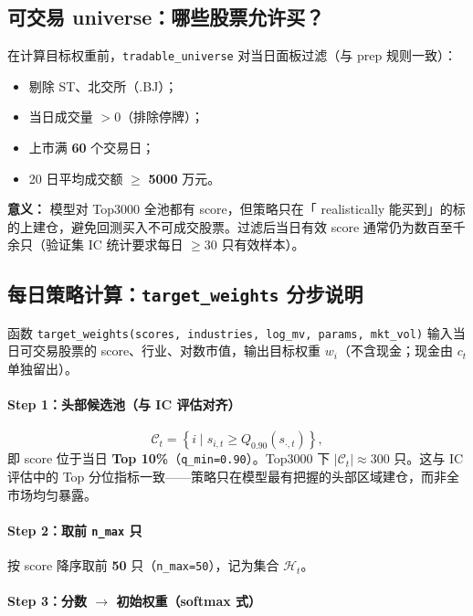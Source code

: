 \documentclass[UTF8,a4paper,12pt]{ctexart}
\begin{document}
\subsection{可交易 universe：哪些股票允许买？}

在计算目标权重前，\texttt{tradable\_universe} 对当日面板过滤（与 prep 规则一致）：
\begin{itemize}[leftmargin=2em]
  \item 剔除 ST、北交所（.BJ）；
  \item 当日成交量 $>0$（排除停牌）；
  \item 上市满 \textbf{60} 个交易日；
  \item 20 日平均成交额 $\geq$ \textbf{5000} 万元。
\end{itemize}

\textbf{意义：} 模型对 Top3000 全池都有 score，但策略只在「 realistically 能买到」的标的上建仓，避免回测买入不可成交股票。过滤后当日有效 score 通常仍为数百至千余只（验证集 IC 统计要求每日 $\ge 30$ 只有效样本）。

\subsection{每日策略计算：\texttt{target\_weights} 分步说明}

函数 \texttt{target\_weights(scores, industries, log\_mv, params, mkt\_vol)} 输入当日可交易股票的 score、行业、对数市值，输出目标权重 $w_i$（不含现金；现金由 $c_t$ 单独留出）。

\paragraph{Step 1：头部候选池（与 IC 评估对齐）}

\begin{equation}
  \mathcal{C}_t = \left\{ i \mid s_{i,t} \ge Q_{0.90}(s_{\cdot,t}) \right\},
\end{equation}
即 score 位于当日 \textbf{Top 10\%}（\texttt{q\_min=0.90}）。Top3000 下 $|\mathcal{C}_t|\approx 300$ 只。这与 IC 评估中的 Top 分位指标一致——策略只在模型最有把握的头部区域建仓，而非全市场均匀暴露。

\paragraph{Step 2：取前 \texttt{n\_max} 只}

按 score 降序取前 \textbf{50} 只（\texttt{n\_max=50}），记为集合 $\mathcal{H}_t$。

\paragraph{Step 3：分数 $\to$ 初始权重（softmax 式）}
\end{document}

